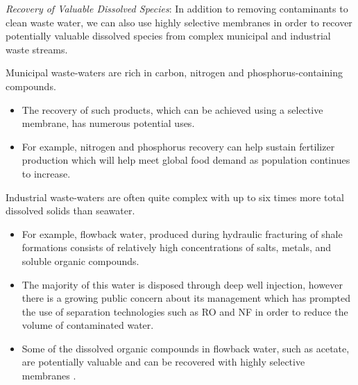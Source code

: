   \textit{Recovery of Valuable Dissolved Species}: In addition to removing contaminants 
  to clean waste water, we can also use highly selective membranes in order to recover
  potentially valuable dissolved species from complex municipal and industrial waste
  streams.~\cite{guest_new_2009,daigger_evolving_2009}
  
  Municipal waste-waters are rich in carbon, nitrogen and phosphorus-containing 
  compounds.~\cite{romero_raw_2013}
  \begin{itemize}  
    \item The recovery of such products, which can be achieved using a 
    selective membrane, has numerous potential uses.\cite{sales_resource_2015}
    \item For example, nitrogen and phosphorus recovery can help sustain fertilizer 
    production which will help meet global food demand as population continues
    to increase.\cite{xie_membrane-based_2016}
  \end{itemize}

  Industrial waste-waters are often quite complex with up to six times more 
  total dissolved solids than seawater.\cite{werber_materials_2016} 
  \begin{itemize}
    \item For example, flowback water, produced during hydraulic fracturing of
    shale formations consists of relatively high concentrations of salts, metals,
    and soluble organic compounds.~\cite{orem_organic_2014}
    \item The majority of this water is disposed through deep well injection, 
    however there is a growing public concern about its management which has 
    prompted the use of separation technologies such as RO and NF in order to 
    reduce the volume of contaminated water.~\cite{gregory_water_2011}
    \item Some of the dissolved organic compounds in flowback water, such as acetate, 
    are potentially valuable and can be recovered with highly selective membranes
    \cite{dischinger_application_2017}.
  \end{itemize}

%  

